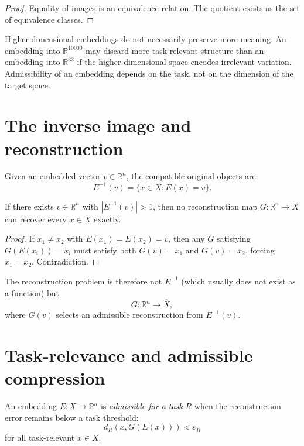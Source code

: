 \begin{proof}
  Equality of images is an equivalence relation.
  The quotient exists as the set of equivalence classes.
\end{proof}

\begin{Misconception}
  Higher-dimensional embeddings do not necessarily preserve more
  meaning.
  An embedding into $\mathbb{R}^{10000}$ may discard more
  task-relevant structure than an embedding into $\mathbb{R}^{32}$
  if the higher-dimensional space encodes irrelevant variation.
  Admissibility of an embedding depends on the task, not on
  the dimension of the target space.
\end{Misconception}

\section{The inverse image and reconstruction}

Given an embedded vector $v \in \mathbb{R}^n$, the compatible
original objects are
\[
  E^{-1}(v) = \{x \in X : E(x) = v\}.
\]

\begin{proposition}
  If there exists $v \in \mathbb{R}^n$ with $|E^{-1}(v)| > 1$,
  then no reconstruction map $G : \mathbb{R}^n \to X$ can
  recover every $x \in X$ exactly.
\end{proposition}

\begin{proof}
  If $x_1 \neq x_2$ with $E(x_1) = E(x_2) = v$, then any
  $G$ satisfying $G(E(x_i)) = x_i$ must satisfy both
  $G(v) = x_1$ and $G(v) = x_2$, forcing $x_1 = x_2$.
  Contradiction.
\end{proof}

The reconstruction problem is therefore not $E^{-1}$
(which usually does not exist as a function) but
\[
  G : \mathbb{R}^n \to \hat{X},
\]
where $G(v)$ selects an admissible reconstruction from
$E^{-1}(v)$.

\section{Task-relevance and admissible compression}

\begin{definition}
  An embedding $E : X \to \mathbb{R}^n$ is
  \emph{admissible for a task} $R$ when the reconstruction
  error remains below a task threshold:
  \[
    d_R(x, G(E(x))) < \varepsilon_R
  \]
  for all task-relevant $x \in X$.
\end{definition}

